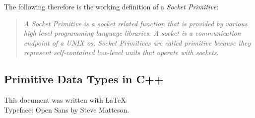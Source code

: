 \documentclass[xcolor=dvipsnames]{article}
\begin{document}
\noindent The following therefore is the working definition of a \textit{Socket Primitive}:

\begin{quote}

\textit{A \textit{Socket Primitive} is a socket related function that is provided by various high-level programming language libraries. A socket is a communication endpoint of a UNIX \gls{os}. Socket Primitives are called primitive because they represent self-contained low-level units that operate with sockets.}

\end{quote}

\newpage

\begin{appendix}

\section{Primitive Data Types in C++}\label{c++_data_types}



\end{appendix}

\newpage

\printnoidxglossaries




\vfill
\begin{center}
This document was written with \LaTeX 
\\Typeface: Open Sans by Steve Matteson.
\end{center}

\end{document}

